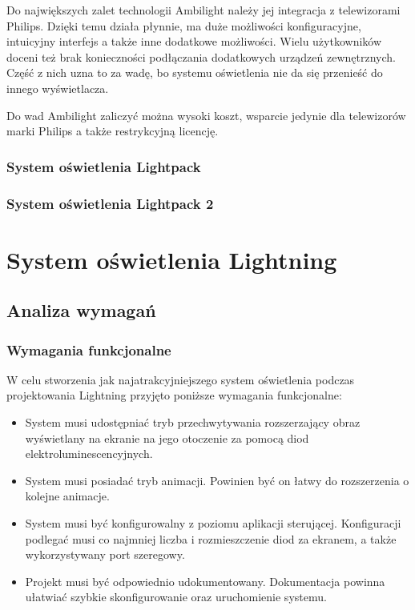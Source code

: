 \documentclass[12pt]{report}
\begin{document}
Do największych zalet technologii Ambilight należy jej integracja z telewizorami Philips. Dzięki temu działa płynnie, ma duże możliwości konfiguracyjne, intuicyjny interfejs a także inne dodatkowe możliwości. Wielu użytkowników doceni też brak konieczności podłączania dodatkowych urządzeń zewnętrznych. Część z nich uzna to za wadę, bo systemu oświetlenia nie da się przenieść do innego wyświetlacza.

Do wad Ambilight zaliczyć można wysoki koszt, wsparcie jedynie dla telewizorów marki Philips a także restrykcyjną licencję.


\subsection{System oświetlenia Lightpack}


\subsection{System oświetlenia Lightpack 2}


\chapter{System oświetlenia Lightning}

\section{Analiza wymagań}

\subsection{Wymagania funkcjonalne}

W celu stworzenia jak najatrakcyjniejszego system oświetlenia podczas projektowania Lightning przyjęto poniższe wymagania funkcjonalne:

\begin{itemize}
\item System musi udostępniać tryb przechwytywania rozszerzający obraz wyświetlany na ekranie na jego otoczenie za pomocą diod elektroluminescencyjnych.
\item System musi posiadać tryb animacji. Powinien być on łatwy do rozszerzenia o kolejne animacje.
\item System musi być konfigurowalny z poziomu aplikacji sterującej. Konfiguracji podlegać musi co najmniej liczba i rozmieszczenie diod za ekranem, a także wykorzystywany port szeregowy.
\item Projekt musi być odpowiednio udokumentowany. Dokumentacja powinna ułatwiać szybkie skonfigurowanie oraz uruchomienie systemu.
\end{itemize}
\end{document}
